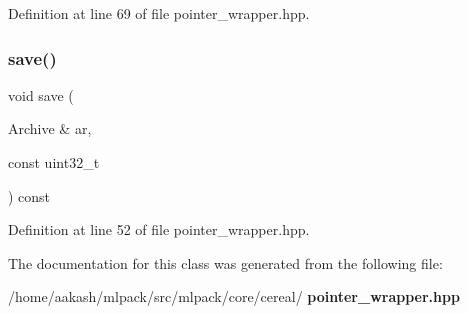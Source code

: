 Definition at line 69 of file pointer\+\_\+wrapper.\+hpp.

\mbox{\label{classcereal_1_1PointerWrapper_a52958fcb465f0f3082b164a49ab238a7}} 
\subsubsection{save()}
{\footnotesize\ttfamily void save (\begin{DoxyParamCaption}\item[{Archive \&}]{ar,  }\item[{const uint32\+\_\+t}]{ }\end{DoxyParamCaption}) const\hspace{0.3cm}{\ttfamily [inline]}}



Definition at line 52 of file pointer\+\_\+wrapper.\+hpp.



The documentation for this class was generated from the following file\+:\begin{DoxyCompactItemize}
\item 
/home/aakash/mlpack/src/mlpack/core/cereal/\textbf{ pointer\+\_\+wrapper.\+hpp}\end{DoxyCompactItemize}
